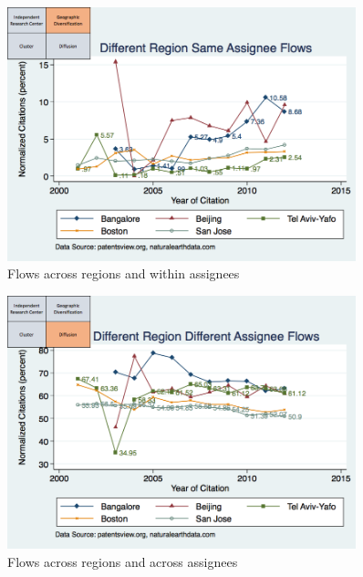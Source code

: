 \documentclass[10pt,letterpaper]{article}
\begin{document}
\\\\
\begin{figure}[h!]
\begin{centering}
  \includegraphics[width=0.90\textwidth]{SMSDiffRegionSameAssigneeFlows}
  \caption{Flows across regions and within assignees}
  \label{fig:SMSDiffRegionSameAssigneeFlows}
\end{centering}
\end{figure}

\begin{figure}[h!]
\begin{centering}
  \includegraphics[width=0.90\textwidth]{SMSDiffRegionDiffAssigneeFlows}
  \caption{Flows across regions and across assignees}
  \label{fig:SMSDiffRegionDiffAssigneeFlows}
\end{centering}
\end{figure}
\end{document}
